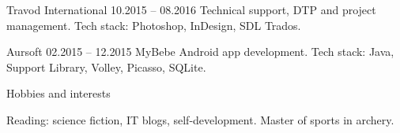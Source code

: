 \documentclass[12pt, a4paper]{article}
\begin{document}
\begin{minipage}[t]{0.6\textwidth}
    Travod International \hfill 10.2015 – 08.2016 \newline
    Technical support, DTP and project management. \newline
    Tech stack: Photoshop, InDesign, SDL Trados.
    
    \bigskip
    
    Aursoft \hfill 02.2015 – 12.2015 \newline
    MyBebe Android app development. \newline
    Tech stack: Java, Support Library, Volley, Picasso, SQLite.

    \bigskip
    
    Hobbies and interests
    
    \bigskip
    
    Reading: science fiction, IT blogs, self-development. Master of sports in archery.
\end{minipage}\\
\end{document}
